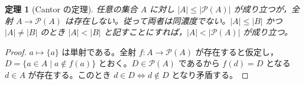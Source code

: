 \documentclass[a5paper,10pt,dvipdfmx]{jsarticle}
\theoremstyle{definition}
\theoremstyle{plain}
\newtheorem{thm}[ruledef]{定理}
\newcommand{\iffc}{\Longleftrightarrow}
\newcommand{\Pow}{\mathcal{P}}
\begin{document}
\begin{thm}[Cantor の定理]\label{k137}
任意の集合 $A$ に対し $|A|\leq|\Pow(A)|$ が成り立つが，全射 $A\to\Pow(A)$ は存在しない。従って両者は同濃度でない。$|A|\leq|B|$ かつ $|A|\ne|B|$ のとき $|A|<|B|$ と記すことにすれば，$|A|<|\Pow(A)|$ が成り立つ。
\end{thm}
\begin{proof}
$a\mapsto\{a\}$ は単射である。全射 $f\colon A\to\Pow(A)$ が存在すると仮定し，$D=\{a\in A\mid a\notin f(a)\}$ とおく。$D\in\Pow(A)$ であるから $f(d)=D$ となる $d\in A$ が存在する。このとき $d\in D\iffc d\notin D$ となり矛盾する。
\end{proof}
\end{document}
